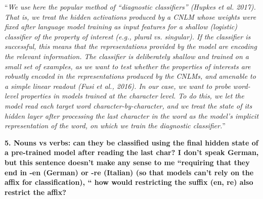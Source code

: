 \documentclass{article}[11pt,a4paper,oneside]
\begin{document}
``\textit{We use here the popular method of ``diagnostic classifiers'' (Hupkes et al. 2017). That is, we treat the hidden activations produced by a CNLM whose weights were fixed after language model training as input features for a shallow (logistic) classifier of the property of interest (e.g., plural vs. singular). If the classifier is successful, this means that the representations provided by the model are encoding the relevant information.  The classifier is deliberately shallow and trained on a small set of examples, as we want to test whether the properties of interests are robustly encoded in the representations produced by the CNLMs, and amenable to a simple linear readout (Fusi et al., 2016). In our case, we want to probe word-level properties in models trained at the character level. To do this, we let the model read each target word character-by-character, and we treat the state of its hidden layer after processing the last character in the word as the model's implicit representation of the word, on which we train the diagnostic classifier.}''
\newline

\textbf{5. Nouns vs verbs: can they be classified using the final hidden state of a pre-trained model after reading the last char? I don't speak German, but this sentence doesn't make any sense to me ``requiring that they end in -en (German) or -re (Italian) (so that models can’t rely on the affix for classification), `` how would restricting the suffix (en, re) also restrict the affix?}
\end{document}
